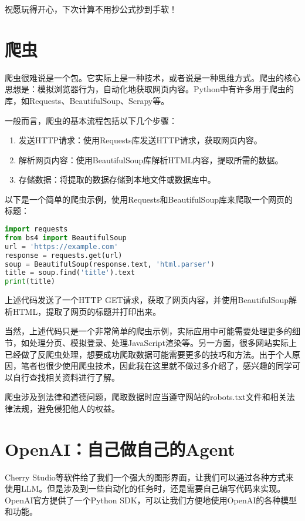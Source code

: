 \documentclass[../main.tex]{subfiles}
\begin{document}
祝愿玩得开心，下次计算不用抄公式抄到手软！

\section{爬虫}

爬虫很难说是一个包。它实际上是一种技术，或者说是一种思维方式。爬虫的核心思想是：模拟浏览器行为，自动化地获取网页内容。Python中有许多用于爬虫的库，如Requests、BeautifulSoup、Scrapy等。

一般而言，爬虫的基本流程包括以下几个步骤：
\begin{enumerate}
  \item 发送HTTP请求：使用Requests库发送HTTP请求，获取网页内容。
  \item 解析网页内容：使用BeautifulSoup库解析HTML内容，提取所需的数据。
  \item 存储数据：将提取的数据存储到本地文件或数据库中。
\end{enumerate}
以下是一个简单的爬虫示例，使用Requests和BeautifulSoup库来爬取一个网页的标题：
\begin{lstlisting}[language=python]
import requests
from bs4 import BeautifulSoup
url = 'https://example.com'
response = requests.get(url)
soup = BeautifulSoup(response.text, 'html.parser')
title = soup.find('title').text
print(title)
\end{lstlisting}
上述代码发送了一个HTTP GET请求，获取了网页内容，并使用BeautifulSoup解析HTML，提取了网页的标题并打印出来。

当然，上述代码只是一个非常简单的爬虫示例，实际应用中可能需要处理更多的细节，如处理分页、模拟登录、处理JavaScript渲染等。另一方面，很多网站实际上已经做了反爬虫处理，想要成功爬取数据可能需要更多的技巧和方法。出于个人原因，笔者也很少使用爬虫技术，因此我在这里就不做过多介绍了，感兴趣的同学可以自行查找相关资料进行了解。

\begin{caution}
  爬虫涉及到法律和道德问题，爬取数据时应当遵守网站的robots.txt文件和相关法律法规，避免侵犯他人的权益。
\end{caution}

\section{OpenAI：自己做自己的Agent}

Cherry Studio等软件给了我们一个强大的图形界面，让我们可以通过各种方式来使用LLM。但是涉及到一些自动化的任务时，还是需要自己编写代码来实现。OpenAI官方提供了一个Python SDK，可以让我们方便地使用OpenAI的各种模型和功能。
\end{document}
